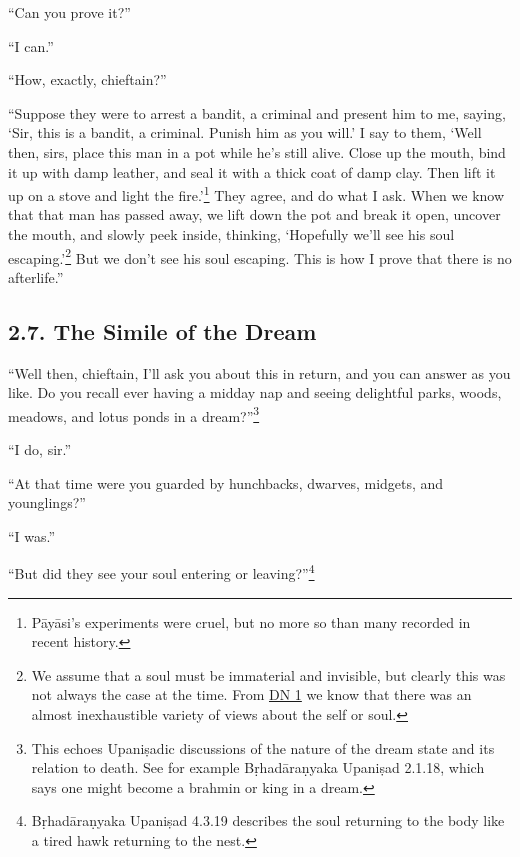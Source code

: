 \documentclass[12pt,openany]{book}%
\begin{document}
“Can you prove it?” 

“I can.” 

“How, exactly, chieftain?” 

“Suppose they were to arrest a bandit, a criminal and present him to me, saying, ‘Sir, this is a bandit, a criminal. Punish him as you will.’ I say to them, ‘Well then, sirs, place this man in a pot while he’s still alive. Close up the mouth, bind it up with damp leather, and seal it with a thick coat of damp clay. Then lift it up on a stove and light the fire.’\footnote{\textsanskrit{Pāyāsi}’s experiments were cruel, but no more so than many recorded in recent history. } They agree, and do what I ask. When we know that that man has passed away, we lift down the pot and break it open, uncover the mouth, and slowly peek inside, thinking, ‘Hopefully we’ll see his soul escaping.’\footnote{We assume that a soul must be immaterial and invisible, but clearly this was not always the case at the time. From \href{https://suttacentral.net/dn1/en/sujato}{DN 1} we know that there was an almost inexhaustible variety of views about the self or soul. } But we don’t see his soul escaping. This is how I prove that there is no afterlife.” 

\subsection*{2.7. The Simile of the Dream }

“Well then, chieftain, I’ll ask you about this in return, and you can answer as you like. Do you recall ever having a midday nap and seeing delightful parks, woods, meadows, and lotus ponds in a dream?”\footnote{This echoes \textsanskrit{Upaniṣadic} discussions of the nature of the dream state and its relation to death. See for example \textsanskrit{Bṛhadāraṇyaka} \textsanskrit{Upaniṣad} 2.1.18, which says one might become a brahmin or king in a dream. } 

“I do, sir.” 

“At that time were you guarded by hunchbacks, dwarves, midgets, and younglings?” 

“I was.” 

“But did they see your soul entering or leaving?”\footnote{\textsanskrit{Bṛhadāraṇyaka} \textsanskrit{Upaniṣad} 4.3.19 describes the soul returning to the body like a tired hawk returning to the nest. } 
\end{document}
